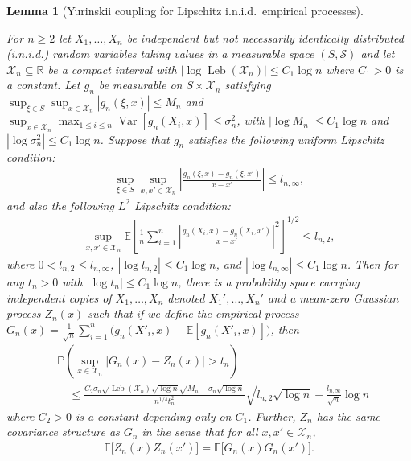 \documentclass[11pt,lof]{puthesis}
\renewcommand{\P}{\ensuremath{\mathbb{P}}}
\newcommand{\R}{\ensuremath{\mathbb{R}}}
\newcommand{\E}{\ensuremath{\mathbb{E}}}
\newcommand{\cX}{\ensuremath{\mathcal{X}}}
\newcommand{\cS}{\ensuremath{\mathcal{S}}}
\DeclareMathOperator{\Var}{Var}
\DeclareMathOperator{\Leb}{Leb}
\theoremstyle{break}
\newtheorem{lemma}{Lemma}[section]
\theoremstyle{proof}
\begin{document}
\begin{lemma}[Yurinskii coupling for Lipschitz i.n.i.d.\ empirical processes]
  \label{lem:kernel_app_yurinskii_corollary}

  For $n \geq 2$ let $X_1, \dots, X_n$
  be independent but not necessarily identically distributed
  (i.n.i.d.) random variables
  taking values in a measurable space $(S, \cS)$
  and let $\cX_n \subseteq \R$
  be a compact interval
  with $\left|\log \Leb(\cX_n)\right| \leq C_1 \log n$
  where $C_1 > 0$ is a constant.
  Let $g_n$ be measurable on $S \times \cX_n$ satisfying
  $\sup_{\xi \in S} \sup_{x \in \cX_n} |g_n(\xi, x)| \leq M_n$
  and $\sup_{x \in \cX_n} \max_{1 \leq i \leq n} \Var[g_n(X_i, x)]
  \leq \sigma_n^2$,
  with $\left|\log M_n\right| \leq C_1 \log n$
  and $\left|\log \sigma_n^2\right| \leq C_1 \log n$.
  Suppose that $g_n$ satisfies the following uniform
  Lipschitz condition:
  \begin{align*}
    \sup_{\xi \in S}
    \sup_{x,x' \in \cX_n}
    \left|
    \frac{g_n(\xi, x) - g_n(\xi, x')}
    {x-x'}
    \right|
    \leq
    l_{n,\infty},
  \end{align*}
  and also the following $L^2$
  Lipschitz condition:
  \begin{align*}
    \sup_{x,x' \in \cX_n}
    \E\left[
      \frac{1}{n}
      \sum_{i=1}^n
      \left|
      \frac{g_n(X_i, x) - g_n(X_i, x')}
      {x-x'}
      \right|^2
    \right]^{1/2}
    \leq
    l_{n,2},
  \end{align*}
  where $0 < l_{n,2} \leq l_{n,\infty}$,
  $\left|\log l_{n,2}\right| \leq C_1 \log n$, and
  $\left|\log l_{n,\infty}\right| \leq C_1 \log n$.
  Then for any $t_n > 0$ with
  $\left|\log t_n\right| \leq C_1 \log n$,
  there is a probability space carrying
  independent copies of $X_1, \ldots, X_n$ denoted $X_1', \ldots, X_n'$
  and a mean-zero Gaussian process $Z_n(x)$
  such that if we define the empirical process
  $G_n(x) = \frac{1}{\sqrt n} \sum_{i=1}^n
  \big( g_n(X'_i,x) - \E[g_n(X'_i,x)] \big)$,
  then
  \begin{align*}
    &\P\left(
      \sup_{x \in \cX_n}
      \big|
      G_n(x) - Z_n(x)
      \big|
      > t_n
    \right) \\
    &\quad\leq
    \frac{
      C_2
      \sigma_n
      \sqrt{\Leb(\cX_n)}
      \sqrt{\log n}
      \sqrt{M_n + \sigma_n\sqrt{\log n}}
    }{n^{1/4} t_n^2}
    \sqrt{
      l_{n,2}
      \sqrt{\log n}
      + \frac{l_{n,\infty}}{\sqrt n}
    \log n}
  \end{align*}
  where $C_2 > 0$ is a constant depending only on $C_1$.
  Further, $Z_n$
  has the same covariance structure as $G_n$
  in the sense that for all $x, x' \in \cX_n$,
  \begin{align*}
    \E\big[Z_n(x) Z_n(x')\big]
    = \E\big[G_n(x) G_n(x')\big].
  \end{align*}

\end{lemma}
\end{document}
